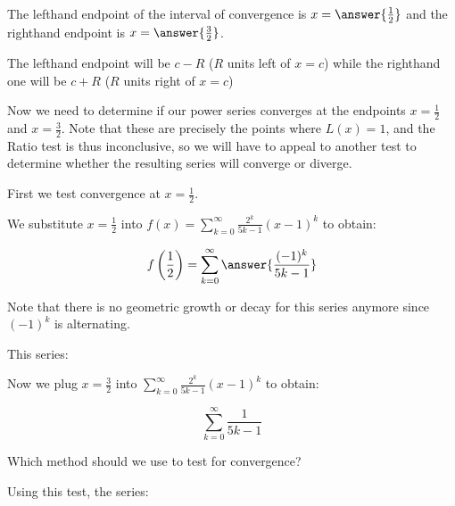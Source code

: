 \documentclass{ximera}
\begin{document}
\begin{exercise}
\begin{exercise}
\begin{exercise}
\begin{exercise}
\begin{exercise}
\begin{image}
\begin{tikzpicture}
\end{tikzpicture}
\end{image}

The lefthand endpoint of the interval of convergence is $x=\answer{\frac{1}{2}}$ and the righthand endpoint is $x= \answer{\frac{3}{2}}$.

\begin{hint}
The lefthand endpoint will be $c-R$ ($R$ units left of $x=c$) while the righthand one will be $c+R$ ($R$ units right of $x=c$) 
\end{hint}

\begin{exercise} 
Now we need to determine if our power series converges at the endpoints $x=\frac{1}{2}$ and $x=\frac{3}{2}$.  Note that these are precisely the points where $L(x)=1$, and the Ratio test is thus inconclusive, so we will have to appeal to another test to determine whether the resulting series will converge or diverge.

First we test convergence at $x=\frac{1}{2}$. 

We substitute $x=\frac{1}{2}$ into $f(x) = \sum_{k=0}^{\infty} \frac{2^k}{5k-1}(x-1)^{k}$ to obtain:

\[
f\left(\frac{1}{2}\right) = \sum^{\infty}_{k=0} \answer{\frac{(-1)^k}{5k-1}}
\]

Note that there is no geometric growth or decay for this series anymore since $(-1)^k$ is alternating.

This series: 

\begin{multipleChoice}
\end{multipleChoice}

Now we plug $x=\frac{3}{2}$ into $\sum_{k=0}^{\infty} \frac{2^k}{5k-1}(x-1)^{k}$ to obtain:

\[
\sum^{\infty}_{k=0} \frac{1}{5k-1}
\]

Which method should we use to test for convergence?

\begin{multipleChoice}
\end{multipleChoice}

Using this test, the series: 
\begin{multipleChoice}
\end{multipleChoice}


\end{exercise}
\end{exercise}
\end{exercise}
\end{exercise}
\end{exercise}
\end{exercise}
\end{document}
